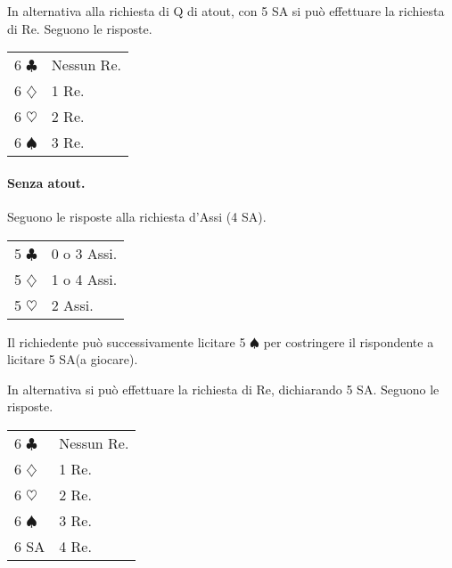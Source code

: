 \documentclass[a4paper,10pt]{article}
\renewcommand{\c}{$\clubsuit$\xspace}
\renewcommand{\d}{$\diamondsuit$\xspace}
\newcommand{\h}{$\heartsuit$\xspace}
\newcommand{\s}{$\spadesuit$\xspace}
\newcommand{\sa}{SA\xspace}
\newcommand{\smallspace}{\vskip0.3cm}
\newenvironment{twocol}
  {\smallspace\noindent\begin{tabular}{l p{0.8\textwidth}}}
  {\end{tabular}\smallspace}
\begin{document}
\smallspace

\noindent In alternativa alla richiesta di Q di atout, con 5 \sa si può effettuare la richiesta di Re. Seguono le risposte.

\begin{twocol}
6 \c & Nessun Re.\\
6 \d & 1 Re.\\
6 \h & 2 Re.\\
6 \s & 3 Re. \\
\end{twocol}

\paragraph{Senza atout.} Seguono le risposte alla richiesta d'Assi (4 \sa).

\begin{twocol}
5 \c & 0 o 3 Assi.\\
5 \d & 1 o 4 Assi.\\
5 \h & 2 Assi.\\
\end{twocol}

\noindent Il richiedente può successivamente licitare 5 \s per costringere il rispondente a licitare 5 \sa (a giocare).

\smallspace

\noindent In alternativa si può effettuare la richiesta di Re, dichiarando 5 \sa. Seguono le risposte.

\begin{twocol}
6 \c & Nessun Re.\\
6 \d & 1 Re.\\
6 \h & 2 Re.\\
6 \s & 3 Re. \\
6 \sa & 4 Re.
\end{twocol}
\end{document}
